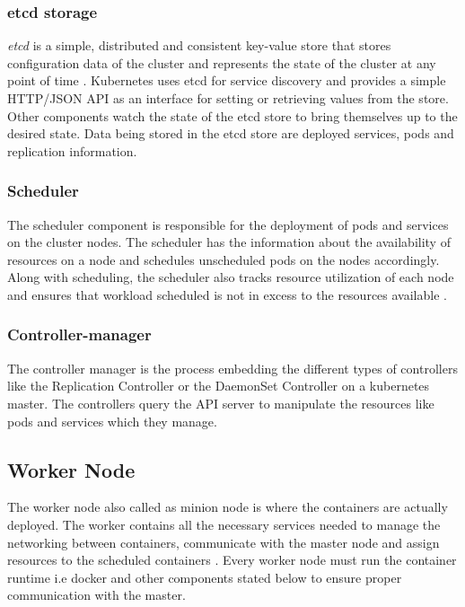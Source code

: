\documentclass[9pt,twocolumn,twoside]{../../styles/osajnl}
\begin{document}
{\subsubsection{etcd storage}
\emph{etcd} is a simple, distributed and consistent key-value store
that stores configuration data of the cluster and represents the state
of the cluster at any point of time
\cite{www-wiki-kubernetes}. Kubernetes uses etcd for service discovery
and provides a simple HTTP/JSON API as an interface for setting or
retrieving values from the store. Other components watch the state of
the etcd store to bring themselves up to the desired state. Data being
stored in the etcd store are deployed services, pods and replication
information.

\subsubsection{Scheduler}
The scheduler component is responsible for the deployment of pods and
services on the cluster nodes. The scheduler has the information about
the availability of resources on a node and schedules unscheduled pods
on the nodes accordingly. Along with scheduling, the scheduler also
tracks resource utilization of each node and ensures that workload
scheduled is not in excess to the resources available
\cite{www-wiki-kubernetes}.

\subsubsection{Controller-manager}
The controller manager is the process embedding the different types of
controllers like the Replication Controller or the DaemonSet
Controller on a kubernetes master. The controllers query the API
server to manipulate the resources like pods and services  which they
manage.

\subsection{Worker Node}
The worker node also called as minion node is where the containers are
actually deployed. The worker contains all the necessary services
needed to manage the networking between containers, communicate with
the master node and assign resources to the scheduled containers
\cite{www-kubernetes-architecture}. Every worker node must run the
container runtime i.e docker and other components stated below to
ensure proper communication with the master.

}
\end{document}
